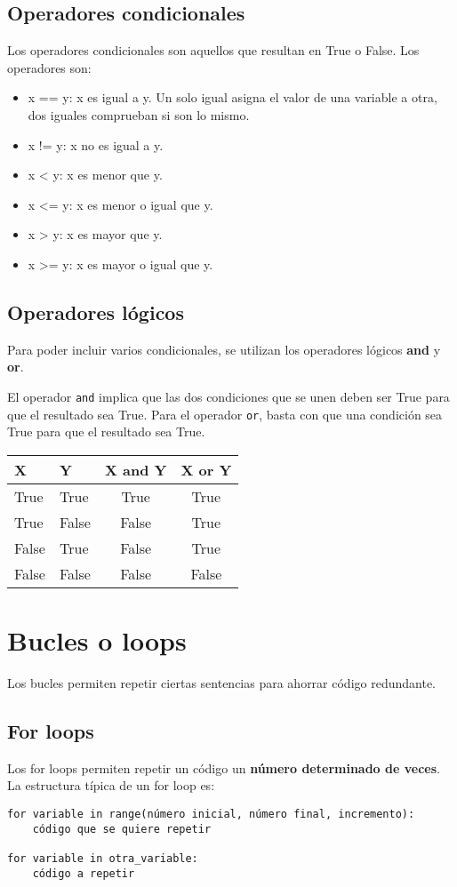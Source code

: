 \subsection{Operadores condicionales}
Los operadores condicionales son aquellos que resultan en True o False. Los operadores son:
\begin{itemize}
\item x == y: x es igual a y. Un solo igual asigna el valor de una variable a otra, dos iguales comprueban si son lo mismo.
\item x != y: x no es igual a y.
\item x < y: x es menor que y.
\item x <= y: x es menor o igual que y.
\item x > y: x es mayor que y.
\item x >= y: x es mayor o igual que y. 
\end{itemize}

\subsection{Operadores lógicos}
Para poder incluir varios condicionales, se utilizan los operadores lógicos \textbf{and} y \textbf{or}. 

El operador \texttt{and} implica que las dos condiciones que se unen deben ser True para que el resultado sea True. Para el operador \texttt{or}, basta con que una condición sea True para que el resultado sea True.

\begin{table}[htbp]
	\centering
	\begin{tabularx}{0.5\textwidth}{XXcc}
	X & Y & X and Y & X or Y \\ \hline
	True & True & True & True \\
	True & False & False & True \\
	False & True & False & True \\
	False & False & False & False
	\end{tabularx}
\end{table}

\section{Bucles o loops}
Los bucles permiten repetir ciertas sentencias para ahorrar código redundante. 

\subsection{For loops}
Los for loops permiten repetir un código un \textbf{número determinado de veces}. La estructura típica de un for loop es:
\begin{lstlisting}
for variable in range(número inicial, número final, incremento):
	código que se quiere repetir
	
for variable in otra_variable:
	código a repetir
\end{lstlisting}

